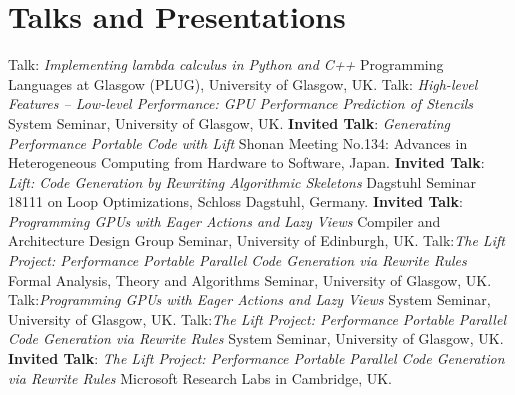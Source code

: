 \documentclass[11pt,a4paper]{moderncv}
\newcommand{\strong}[1]{\textcolor{color1}{\textbf{#1}}}
\begin{document}
\section{Talks and Presentations}
         {Talk: \emph{Implementing lambda calculus in Python and C++}\newline
          \small Programming Languages at Glasgow (PLUG), University of Glasgow, UK.}
         {Talk: \emph{High-level Features – Low-level Performance: GPU Performance Prediction of Stencils}\newline
          \small System Seminar, University of Glasgow, UK.}
         {\strong{Invited Talk}:\newline
          \emph{Generating Performance Portable Code with Lift}\newline
         \small Shonan Meeting No.134: Advances in Heterogeneous Computing from Hardware to Software, Japan.}
         {\strong{Invited Talk}:\newline
          \emph{Lift: Code Generation by Rewriting Algorithmic Skeletons}\newline
         \small Dagstuhl Seminar 18111 on Loop Optimizations, Schloss Dagstuhl, Germany.}
         {\strong{Invited Talk}:\newline
          \emph{Programming GPUs with Eager Actions and Lazy Views}\newline
         \small Compiler and Architecture Design Group Seminar, University of Edinburgh, UK.}
         {Talk:\emph{The Lift Project: Performance Portable Parallel Code Generation via Rewrite Rules}\newline
         \small Formal Analysis, Theory and Algorithms Seminar, University of Glasgow, UK.}
         {Talk:\emph{Programming GPUs with Eager Actions and Lazy Views}\newline
         \small System Seminar, University of Glasgow, UK.}
         {Talk:\emph{The Lift Project: Performance Portable Parallel Code Generation via Rewrite Rules}\newline
         \small System Seminar, University of Glasgow, UK.}
         {\strong{Invited Talk}:\newline
          \emph{The Lift Project: Performance Portable Parallel Code Generation via Rewrite Rules}\newline
         \small Microsoft Research Labs in Cambridge, UK.}
\end{document}
